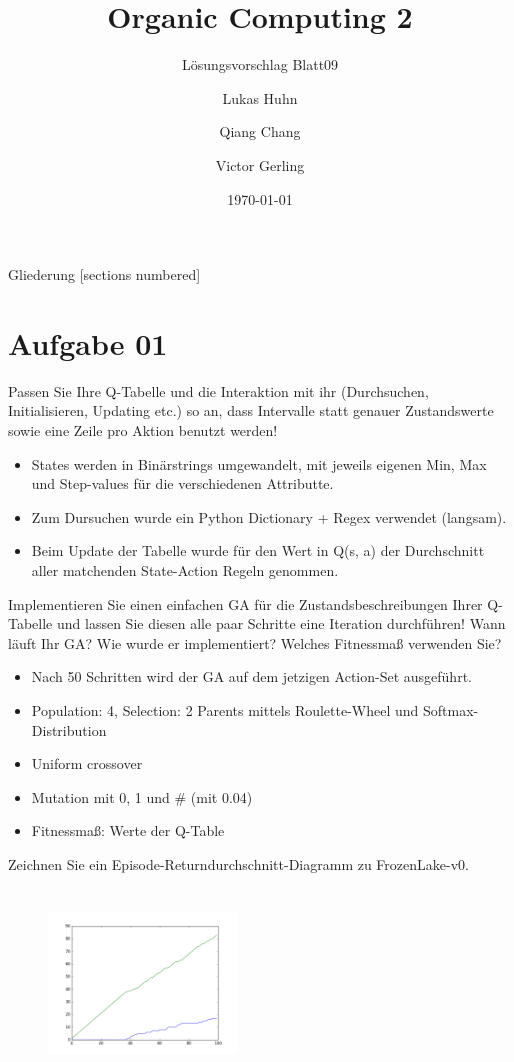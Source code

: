 \documentclass{ocbeameruni}
\title{Organic Computing 2}
\subtitle{Lösungsvorschlag Blatt09}
\date{\today}
\author{Lukas Huhn \and Qiang Chang \and Victor Gerling}
\institute{%
  Universität Augsburg\\
  Institut für Informatik\\
  Lehrstuhl für Organic Computing
}
\begin{document}
\maketitle


\begin{frame}{Gliederung}
  [sections numbered]
  \tableofcontents
\end{frame}


\section{Aufgabe 01}

\begin{frame}{1.1}
Passen Sie Ihre Q-Tabelle und die Interaktion mit ihr (Durchsuchen, Initialisieren, Updating
etc.) so an, dass Intervalle statt genauer Zustandswerte sowie eine Zeile pro Aktion benutzt
werden!
    \begin{itemize}
    \item States werden in Binärstrings umgewandelt, mit jeweils eigenen Min, Max und Step-values für die verschiedenen Attributte.
    \item Zum Dursuchen wurde ein Python Dictionary + Regex verwendet (langsam).
    \item Beim Update der Tabelle wurde für den Wert in Q(s, a) der Durchschnitt aller matchenden State-Action Regeln genommen. 
    \end{itemize}
\end{frame}

\begin{frame}{1.2}
Implementieren Sie einen einfachen GA für die Zustandsbeschreibungen Ihrer Q-Tabelle und
lassen Sie diesen alle paar Schritte eine Iteration durchführen! Wann läuft Ihr GA? Wie wurde
er implementiert? Welches Fitnessmaß verwenden Sie?
    \begin{itemize}
    \item Nach 50 Schritten wird der GA auf dem jetzigen Action-Set ausgeführt. 
    \item Population: 4, Selection: 2 Parents mittels Roulette-Wheel und Softmax-Distribution
    \item Uniform crossover
    \item Mutation mit 0, 1 und # (mit 0.04)
    \item Fitnessmaß: Werte der Q-Table
    \end{itemize}
\end{frame}


\begin{frame}{1.3}
Zeichnen Sie ein Episode-Returndurchschnitt-Diagramm zu FrozenLake-v0.
\begin{figure}[ht]
    \centering
    \includegraphics[width=50mm, height=50mm]{plots/figure_1.png} 
\end{figure}
 
\end{frame}
\end{document}
